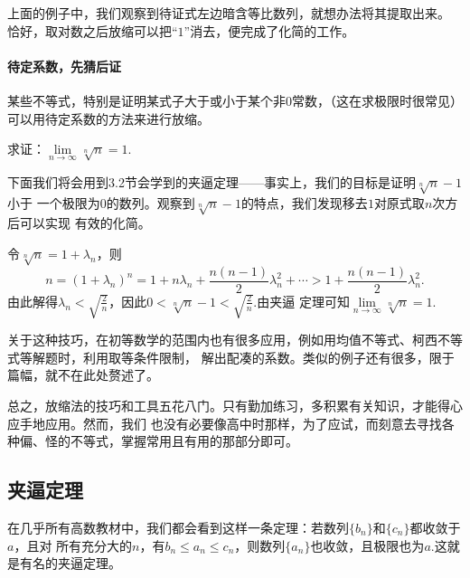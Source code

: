 上面的例子中，我们观察到待证式左边暗含等比数列，就想办法将其提取出来。
恰好，取对数之后放缩可以把“$1$”消去，便完成了化简的工作。

\paragraph{待定系数，先猜后证}

某些不等式，特别是证明某式子大于或小于某个非0常数，（这在求极限时很常见）可以用待定系数的方法来进行放缩。
\begin{example}
    求证：$\lim\limits_{n \to \infty}\sqrt[n]{n}=1.$
\end{example}
\begin{prove}
    下面我们将会用到3.2节会学到的夹逼定理——事实上，我们的目标是证明$\sqrt[n]{n}-1$小于
    一个极限为$0$的数列。观察到$\sqrt[n]{n}-1$的特点，我们发现移去$1$对原式取$n$次方后可以实现
    有效的化简。


    令$\sqrt[n]{n}=1+\lambda_n$，则
    \[
        n=(1+\lambda_n)^n=1+n\lambda_n+\frac{n(n-1)}{2}\lambda^2 _n+\cdots >1+\frac{n(n-1)}{2}\lambda^2 _n
        .\]
    由此解得$\lambda_n<\sqrt{\frac{2}{n}}$，因此$0<\sqrt[n]{n}-1<\sqrt{\frac{2}{n}}$.由夹逼
    定理可知$\lim\limits_{n \to \infty}\sqrt[n]{n}=1.$
\end{prove}


关于这种技巧，在初等数学的范围内也有很多应用，例如用均值不等式、柯西不等式等解题时，利用取等条件限制，
解出配凑的系数。类似的例子还有很多，限于篇幅，就不在此处赘述了。


总之，放缩法的技巧和工具五花八门。只有勤加练习，多积累有关知识，才能得心应手地应用。然而，我们
也没有必要像高中时那样，为了应试，而刻意去寻找各种偏、怪的不等式，掌握常用且有用的那部分即可。



\subsection{夹逼定理}
在几乎所有高数教材中，我们都会看到这样一条定理：若数列$\{ b_n \} $和$\{ c_n \} $都收敛于$a$，且对
所有充分大的$n$，有$b_n \leqslant a_n \leqslant c_n$，则数列$\{ a_n \} $也收敛，且极限也为$a$.这就是有名的夹逼定理。


